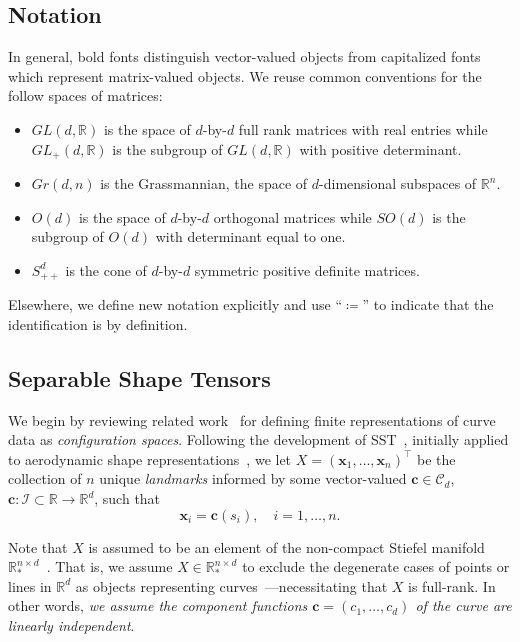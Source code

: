 \documentclass[pdflatex,iicol]{sn-jnl}%
\theoremstyle{thmstyleone}%
\theoremstyle{thmstyletwo}%
\theoremstyle{thmstylethree}%
\begin{document}
\subsection{Notation}
In general, bold fonts distinguish vector-valued objects from capitalized fonts which represent matrix-valued objects. We reuse common conventions for the follow spaces of matrices:
\begin{itemize}
    \item $GL(d,\mathbb{R})$ is the space of $d$-by-$d$ full rank matrices with real entries while $GL_+(d,\mathbb{R})$ is the subgroup of $GL(d,\mathbb{R})$ with positive determinant.
    \item $Gr(d,n)$ is the Grassmannian, the space of $d$-dimensional subspaces of $\mathbb{R}^n$.
    \item $O(d)$ is the space of $d$-by-$d$ orthogonal matrices while $SO(d)$ is the subgroup of $O(d)$ with determinant equal to one.
    \item $S^d_{++}$ is the cone of $d$-by-$d$ symmetric positive definite matrices.
\end{itemize}
Elsewhere, we define new notation explicitly and use ``$\coloneqq$'' to indicate that the identification is by definition.

\subsection{Separable Shape Tensors} \label{subsec:SST}
We begin by reviewing related work~\cite{grey2023separable, bryner20142d, srivastava2016functional} for defining finite representations of curve data as \textit{configuration spaces}. Following the development of SST~\cite{grey2023separable}, initially applied to aerodynamic shape representations~\cite{doronina2022grassmannian}, we let $X = (\boldsymbol{x}_1,\dots,\boldsymbol{x}_n)^{\top}$ be the collection of $n$ unique \emph{landmarks} informed by some vector-valued $\boldsymbol{c}\in \mathcal{C}_d$, $\boldsymbol{c}:\mathcal{I} \subset \mathbb{R} \rightarrow \mathbb{R}^d$, such that
\begin{equation}\label{eq:data}
    \boldsymbol{x}_i = \boldsymbol{c}(s_i), \quad i=1,\dots,n.
\end{equation}

Note that $X$ is assumed to be an element of the non-compact Stiefel manifold $\mathbb{R}^{n \times d}_*$~\cite{absil2008optimization}. That is, we assume $X \in \mathbb{R}^{n \times d}_*$ to exclude the degenerate cases of points or lines in $\mathbb{R}^d$ as objects representing curves~\cite{grey2023separable}---necessitating that $X$ is full-rank. In other words, \textit{we assume the component functions $\boldsymbol{c} = (c_1,\dots,c_d)$ of the curve are linearly independent}. 
\end{document}

